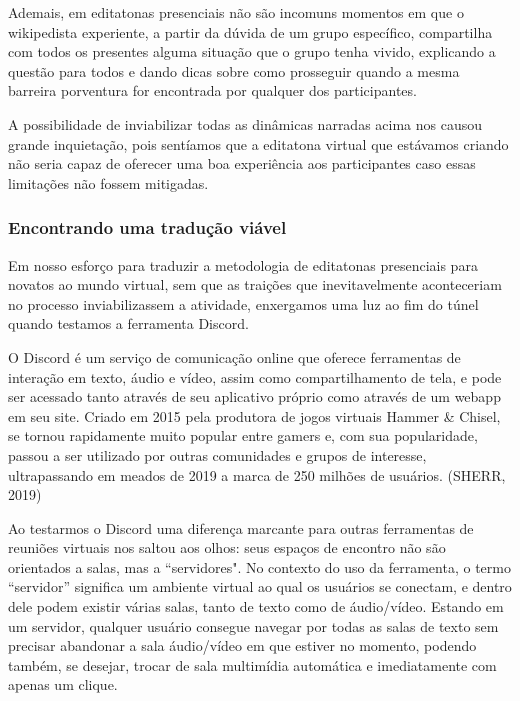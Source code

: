 Ademais, em editatonas presenciais não são incomuns momentos em que o wikipedista experiente, a partir da dúvida de um grupo específico, compartilha com todos os presentes alguma situação que o grupo tenha vivido, explicando a questão para todos e dando dicas sobre como prosseguir quando a mesma barreira porventura for encontrada por qualquer dos participantes.

A possibilidade de inviabilizar todas as dinâmicas narradas acima nos causou grande inquietação, pois sentíamos que a editatona virtual que estávamos criando não seria capaz de oferecer uma boa experiência aos participantes caso essas limitações não fossem mitigadas.

\subsubsection{Encontrando uma tradução viável}

Em nosso esforço para traduzir a metodologia de editatonas presenciais para novatos ao mundo virtual, sem que as traições que inevitavelmente aconteceriam no processo inviabilizassem a atividade, enxergamos uma luz ao fim do túnel quando testamos a ferramenta Discord.

O Discord é um serviço de comunicação online que oferece ferramentas de interação em texto, áudio e vídeo, assim como compartilhamento de tela, e pode ser acessado tanto através de seu aplicativo próprio como através de um webapp em seu site. Criado em 2015 pela produtora de jogos virtuais Hammer \& Chisel, se tornou rapidamente muito popular entre gamers e, com sua popularidade, passou a ser utilizado por outras comunidades e grupos de interesse, ultrapassando em meados de 2019 a marca de 250 milhões de usuários. (SHERR, 2019)

Ao testarmos o Discord uma diferença marcante para outras ferramentas de reuniões virtuais nos saltou aos olhos: seus espaços de encontro não são orientados a salas, mas a “servidores". No contexto do uso da ferramenta, o termo “servidor” significa um ambiente virtual ao qual os usuários se conectam, e dentro dele podem existir várias salas, tanto de texto como de áudio/vídeo. Estando em um servidor, qualquer usuário consegue navegar por todas as salas de texto sem precisar abandonar a sala áudio/vídeo em que estiver no momento, podendo também, se desejar, trocar de sala multimídia automática e imediatamente com apenas um clique.

